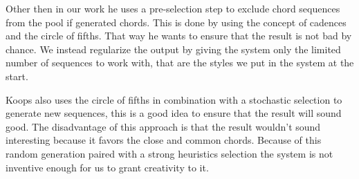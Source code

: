 Other then in our work he uses a pre-selection step to exclude chord sequences from the pool if generated chords. This is done by using the concept of cadences and the circle of fifths. That way he wants to ensure that the result is not bad by chance. We instead regularize the output by giving the system only the limited number of sequences to work with, that are the styles we put in the system at the start. 

Koops also uses the circle of fifths in combination with a stochastic selection to generate new sequences, this is a good idea to ensure that the result will sound good. The disadvantage of this approach is that the result wouldn't sound interesting because it favors the close and common chords. Because of this random generation paired with a strong heuristics selection the system is not inventive enough for us to grant creativity to it.





  
